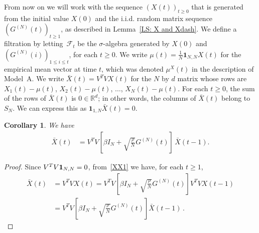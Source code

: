\documentclass[12pt]{article}
\newtheorem{corollary}{Corollary}
\newcommand{\1}{\mathbf{1}}
\begin{document}
From now on we will work with the sequence $\left(X(t)\right)_{t \ge 0}$ that is generated from the initial value $X(0)$ and the i.i.d. random matrix sequence $\left(G^{(N)}(t)\right)_{t \ge 1}$, as described in Lemma~\ref{LS: X and Xdash}. We define a filtration by letting~$\mathcal{F}_t$ be the $\sigma$-algebra generated by $X(0)$ and $\left(G^{(N)}(i)\right)_{1 \le i \le t}$, for each $t \ge 0$. We write $\mu(t) = \frac{1}{N} \mathbf{1}_{N,N} X(t)$ for the empirical mean vector at time $t$, which was denoted $\mu^X\!(t)$ in the description of Model~A. We write $\bar{X}(t) = V^TV X(t)$ for the $N$ by $d$ matrix whose rows are $X_1(t) - \mu(t)$, $X_2(t) - \mu(t)$, $\dots$, $X_N(t) - \mu(t)$. For each $t \ge 0$, the sum of the rows of $\bar{X}(t)$ is $0 \in \mathbb{R}^d$; in other words, the columns of $\bar{X}(t)$ belong to $S_N$. We can express this as $ \mathbf{1}_{1,N} \bar{X}(t) = 0$. 
\begin{corollary}
We have
\begin{align*} 
\bar{X}(t)&=
V^T V \left[\beta I_N
+\sqrt{\frac{\rho}N} G^{(N)}(t)  \right]\,\bar{X}(t-1).
\end{align*}
\end{corollary}
\begin{proof}
Since $V^T V{\bf 1}_{N,N}=0$, from~\eqref{XX1} we have, for each $t \ge 1$,
\begin{align*}
\bar{X}(t) &= V^T V X (t) =
V^T V \left[\beta I_N
+\sqrt{\frac{\rho}N} G^{(N)}(t)  \right] V^T V X(t-1) \\
& =V^T V \left[\beta I_N
+\sqrt{\frac{\rho}N} G^{(N)}(t)  \right] \bar X(t-1)\,.
\end{align*}
\end{proof}
\end{document}
